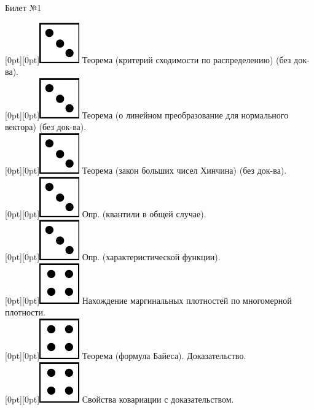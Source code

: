 \documentclass[10pt]{article}
\begin{document}
 
\begin{center} {\Large Билет №1} \end{center} 

\raisebox{-1pt}[0pt][0pt]{\includegraphics[width=0.02\linewidth]{3.png}} Теорема (критерий сходимости по распределению) (без док-ва). \\

\raisebox{-1pt}[0pt][0pt]{\includegraphics[width=0.02\linewidth]{3.png}} Теорема (о линейном преобразование для нормального вектора) (без док-ва). \\

\raisebox{-1pt}[0pt][0pt]{\includegraphics[width=0.02\linewidth]{3.png}} Теорема (закон больших чисел Хинчина) (без док-ва). \\

\raisebox{-1pt}[0pt][0pt]{\includegraphics[width=0.02\linewidth]{3.png}}   Опр. (квантили в общей случае). \\

\raisebox{-1pt}[0pt][0pt]{\includegraphics[width=0.02\linewidth]{3.png}} Опр. (характеристической функции). \\

\raisebox{-1pt}[0pt][0pt]{\includegraphics[width=0.02\linewidth]{4.png}} Нахождение маргинальных плотностей по многомерной плотности. \\

\raisebox{-1pt}[0pt][0pt]{\includegraphics[width=0.02\linewidth]{4.png}} Теорема (формула Байеса). Доказательство. \\

\raisebox{-1pt}[0pt][0pt]{\includegraphics[width=0.02\linewidth]{4.png}} Свойства ковариации с доказательством. \\
\end{document}
